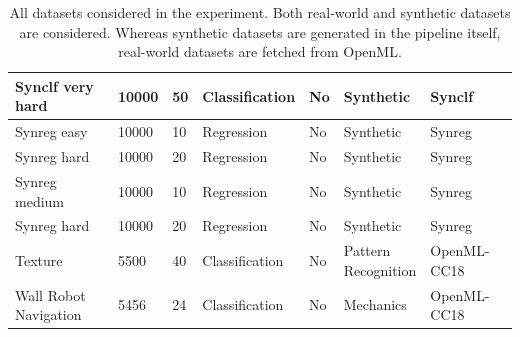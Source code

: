 \documentclass[../main.tex]{subfiles}
\begin{document}
\begin{table}[ht]
\begin{tabular}{| l | l | l | l | l | l | l |}
    \hline
    Synclf very hard & 10000 & 50 & Classification & No & Synthetic & Synclf \\ 
    \hline
    Synreg easy & 10000 & 10 & Regression & No & Synthetic & Synreg \\ 
    \hline
    Synreg hard & 10000 & 20 & Regression & No & Synthetic & Synreg \\ 
    \hline
    Synreg medium & 10000 & 10 & Regression & No & Synthetic & Synreg \\ 
    \hline
    Synreg hard & 10000 & 20 & Regression & No & Synthetic & Synreg \\ 
    \hline
    Texture & 5500 & 40 & Classification & No & \makecell[tl]{Pattern \\Recognition} & OpenML-CC18 \citep{bischl_openml_2019} \\ 
    \hline
    \makecell[tl]{Wall Robot \\Navigation} & 5456 & 24 & Classification & No & Mechanics & OpenML-CC18 \citep{bischl_openml_2019} \\ 
    \hline
    \end{tabular}
    \caption{All datasets considered in the experiment. Both real-world and synthetic datasets are considered. Whereas synthetic datasets are generated in the pipeline itself, real-world datasets are fetched from OpenML.}
    \label{table:experiments-dataset-specification}
\end{table}
\end{document}
